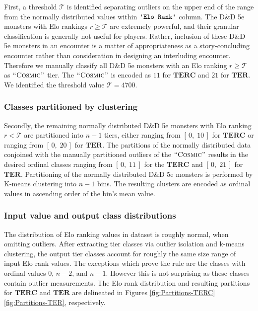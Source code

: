 \documentclass{article}
\newcommand{\Qty}[1]{\oldstylenums{#1}}
\newcommand{\TER}{\ensuremath{\mathbf{TER}}\xspace}
\newcommand{\TERC}{\ensuremath{\mathbf{TERC}}\xspace}
\newcommand{\DnD}{D\&D 5e\xspace}
\newcommand{\Column}[1]{\ensuremath{\texttt{\textquotesingle{}#1\textquotesingle{}}}\xspace}
\newcommand{\NumericRange}[2]{\ensuremath{\left[\,#1,\; #2\,\right]}\xspace}
\newcommand{\TierCosmic}{\ensuremath{\textsc{``Cosmic''}}\xspace}
\begin{document}
First, a threshold $\mathcal{T}$ is identified separating outliers on the upper end of the range from the normally distributed values within \Column{Elo Rank} column.
The \DnD monsters with Elo rankings $r \ge \mathcal{T}$ are extremely powerful, and their granular classification is generally not useful for players.
Rather, inclusion of these \DnD monsters in an encounter is a matter of appropriateness as a story-concluding encounter rather than consideration in designing an interluding encounter.
Therefore we manually classify all \DnD monsters with an Elo ranking $r \ge \mathcal{T}$ as \TierCosmic tier.
The \TierCosmic is encoded as $11$ for \TERC and $21$ for \TER.
We identified the threshold value $\mathcal{T} = 4700$.


\subsubsection{Classes partitioned by clustering}

Secondly, the remaining normally distributed \DnD monsters with Elo ranking $r < \mathcal{T}$ are partitioned into $n - 1$ tiers, either \Qty{11} ranging from \NumericRange{0}{10} for \TERC or \Qty{21} ranging from \NumericRange{0}{20} for \TER.
The partitions of the normally distributed data conjoined with the manually partitioned outliers of the \TierCosmic results in the desired ordinal classes ranging from \NumericRange{0}{11} for the \TERC and \NumericRange{0}{21} for \TER.
Partitioning of the normally distributed \DnD monsters is performed by K-means clustering into $n - 1$ bins.
The resulting clusters are encoded as ordinal values in ascending order of the bin's mean value.


\subsubsection{Input value and output class distributions}

The distribution of Elo ranking values in dataset is roughly normal, when omitting outliers.
After extracting tier classes via outlier isolation and k-means clustering, the output tier classes account for roughly the same size range of input Elo rank values.
The exceptions which prove the rule are the classes with ordinal values $0$, $n- 2$, and $n - 1$.
However this is not surprising as these classes contain outlier measurements.
The Elo rank distribution and resulting partitions for \TERC and \TER are delineated in Figures \ref{fig:Partitions-TERC} \ref{fig:Partitions-TER}, respectively.
 
\end{document}
